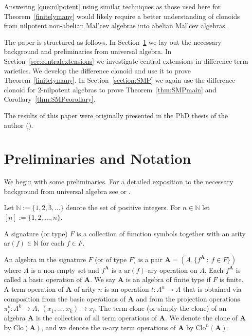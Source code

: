\documentclass[12pt]{amsart}
\numberwithin{equation}{section}
\theoremstyle{plain}
\theoremstyle{definition}
\newcommand{\st}{\ :\ }
\newcommand{\A}{\mathbf{A}}
\newcommand{\N}{\mathbb{N}}
\newcommand{\Clo}{\mathrm{Clo}}
\begin{document}
Answering \ref{que:nilpotent} using similar techniques as those used here for Theorem~\ref{finitelymany}
  would likely require a better understanding of clonoids from nilpotent non-abelian 
  Mal'cev algebras into abelian Mal'cev algebras.

The paper is structured as follows.
In Section~\ref{Prelims} we lay out the necessary background and preliminaries from universal algebra.
In Section~\ref{sec:centralextensions} we investigate central extensions in difference term varieties.
We develop the difference clonoid and use it to prove Theorem~\ref{finitelymany}.
In Section~\ref{section:SMP} we again use the difference clonoid for $2$-nilpotent algebras 
to prove Theorem~\ref{thm:SMPmain} and Corollary~\ref{thm:SMPcorollary}.

The results of this paper were originally presented in the PhD thesis of the author (\cite{Wy:CNMA}).





\section{Preliminaries and Notation} 
\label{Prelims}

We begin with some preliminaries.
For a detailed exposition to the necessary background from 
universal algebra see \cite{BS:UA} or \cite{Berg:UA}.

Let $\N := \{1,2,3,\dots \}$ denote the set of positive integers.
For $n \in \N$ let $[n] := \{1,2,\dots,n\}$.

A signature (or type) $F$ is a collection of function symbols 
  together with an arity $\text{ar}(f) \in \N$ for each $f \in F$. 


An algebra in the signature $F$ (or of type $F$) is a pair $\A = (A,\{f^\A \st f \in F\})$ 
  where $A$ is a non-empty set and $f^\A$ is a $\text{ar}(f)$-ary operation on $A$.
  Each $f^\A$ is called a basic operation of $\A$.
We say $\A$ is an algebra of finite type if $F$ is finite.
A term operation of $\A$ of arity $n$ is an operation $t \colon A^n \rightarrow A$
  that is obtained via composition from the basic operations of $\A$ 
  and from the projection operations $\pi_i^k \colon A^k \rightarrow A, \, (x_1, \dots, x_k) \mapsto x_i$.
The term clone (or simply the clone) of an algebra $\A$ 
  is the collection of all term operations of $\A$.
We denote the clone of $\A$ by $\Clo(\A)$,
  and we denote the $n$-ary term operations of $\A$ by $\Clo^n(\A)$.
\end{document}
